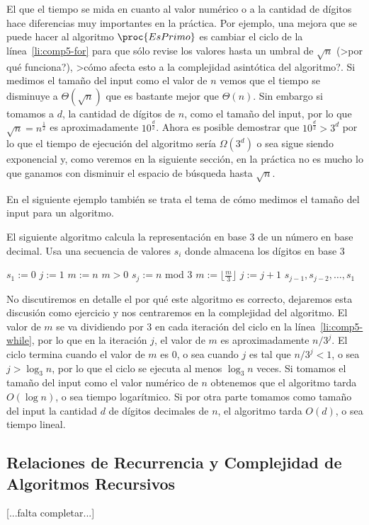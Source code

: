 El que el tiempo se mida en cuanto al valor numérico o a la cantidad de dígitos hace diferencias muy importantes en la práctica.
Por ejemplo, una mejora que se puede hacer al algoritmo $\proc{EsPrimo}$ es cambiar el ciclo de la línea~\ref{li:comp5-for} para que sólo revise los valores hasta un umbral de $\sqrt n$ (>por qué funciona?), >cómo afecta esto a la complejidad asintótica del algoritmo?.
Si medimos el tamaño del input como el valor de $n$ vemos que el tiempo se disminuye a $\Theta(\sqrt n)$ que es bastante mejor que $\Theta(n)$.
Sin embargo si tomamos a $d$, la cantidad de dígitos de $n$, como el tamaño del input, por lo que $\sqrt n=n^\frac{1}{2}$ es aproximadamente $10^{\frac{d}{2}}$.
Ahora es posible demostrar que $10^{\frac{d}{2}}>3^d$ por lo que el tiempo de ejecución del algoritmo sería $\Omega(3^d)$ o sea sigue siendo exponencial y, como veremos en la siguiente sección, en la práctica no es mucho lo que ganamos con disminuir el espacio de búsqueda hasta $\sqrt n$.



En el siguiente ejemplo también se trata el tema de cómo medimos el tamaño del input para un algoritmo.

\begin{ejemplo}
El siguiente algoritmo calcula la representación en base $3$ de un número en base decimal.
Usa una secuencia de valores $s_i$ donde almacena los dígitos en base $3$
\begin{codebox}
\li $s_1:=0$
\li $j:=1$
\li $m:=n$
\li \While $m>0$ \Do \label{li:comp5-while}
\li \> $s_j:=n$ mod $3$
\li \> $m:=\lfloor\frac{m}{3}\rfloor$
\li \> $j:=j+1$
 $s_{j-1},s_{j-2},\ldots,s_1$
\end{codebox}
No discutiremos en detalle el por qué este algoritmo es correcto, dejaremos esta discusión como ejercicio y nos centraremos en la complejidad del algoritmo.
El valor de $m$ se va dividiendo por $3$ en cada iteración del ciclo en la línea~\ref{li:comp5-while}, por lo que en la iteración $j$, el valor de $m$ es aproximadamente $n/3^j$.
El ciclo termina cuando el valor de $m$ es 0, o sea cuando $j$ es tal que $n/3^j<1$, o sea $j>\log_3 n$, por lo que el ciclo se ejecuta al menos $\log_3 n$ veces.
Si tomamos el tamaño del input como el valor numérico de $n$ obtenemos que el algoritmo tarda $O(\log n)$, o sea tiempo logarítmico.
Si por otra parte tomamos como tamaño del input la cantidad $d$ de dígitos decimales de $n$, el algoritmo tarda $O(d)$, o sea tiempo lineal.
\end{ejemplo}

\subsection{Relaciones de Recurrencia y Complejidad de Algoritmos Recursivos}
[...falta completar...]


